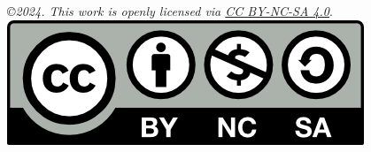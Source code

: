 \emph{\copyright 2024. This work is openly licensed via \href{https://creativecommons.org/licenses/by-nc-sa/4.0/}{CC BY-NC-SA 4.0}}.\\
\includegraphics*[]{../Images/by-nc-sa.png}